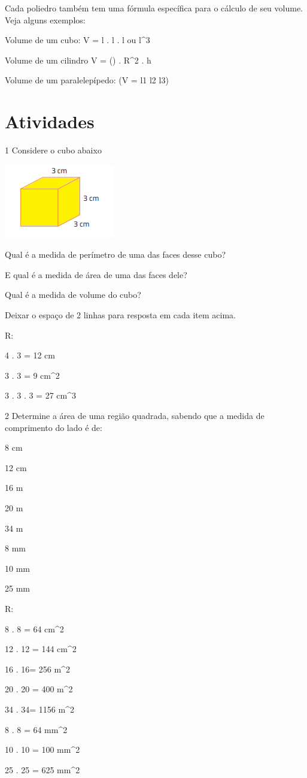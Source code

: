 {Cada poliedro também tem uma fórmula específica para o cálculo de seu
volume. Veja alguns exemplos:

Volume de um cubo: V = l . l . l ou l^3

Volume de um cilindro V = (\Pi) . R^2 . h

Volume de um paralelepípedo: (V = l1 \times l2 \times l3)

\section{Atividades}

\num{1} Considere o cubo abaixo

\includegraphics[width=1.89583in,height=1.27083in]{./imgSAEB_8_MAT/media/image42.png}
\item Qual é a medida de perímetro de uma das faces desse cubo?
\item E qual é a medida de área de uma das faces dele?
\item Qual é a medida de volume do cubo?

Deixar o espaço de 2 linhas para resposta em cada item acima.

R:
\item 4 . 3 = 12 cm
\item 3 . 3 = 9 cm^2
\item 3 . 3 . 3 = 27 cm^3

\num{2} Determine a área de uma região quadrada, sabendo que a medida de
comprimento do lado é de:
\item 8 cm
\item 12 cm
\item 16 m
\item 20 m
\item 34 m
\item 8 mm
\item 10 mm
\item 25 mm

R:
\item 8 . 8 = 64 cm^2
\item 12 . 12 = 144 cm^2
\item16 . 16= 256 m^2
\item20 . 20 = 400 m^2
\item34 . 34= 1156 m^2
\item 8 . 8 = 64 mm^2
\item 10 . 10 = 100 mm^2
\item 25 . 25 = 625 mm^2

}

